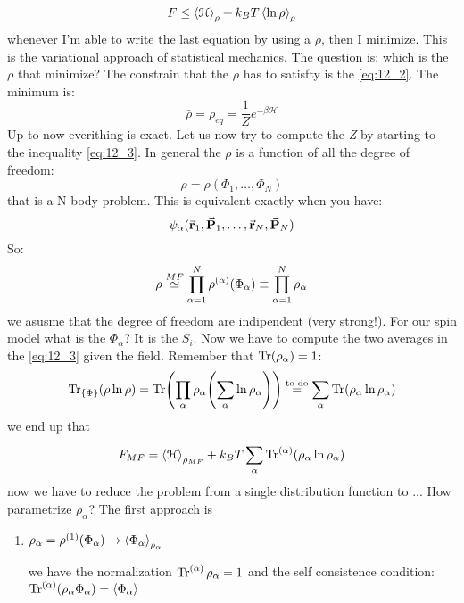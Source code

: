 \documentclass[../main/main.tex]{subfiles}
\begin{document}
\begin{equation}
  F \le \expval{\mathcal{H}}_\rho + k_B T \expval{\ln{\rho } }_\rho
  \label{eq:12_3}
\end{equation}
whenever I'm able to write the last equation by using a \( \rho  \), then I minimize. This is the variational approach of statistical mechanics. The question is: which is the \( \rho  \) that minimize?
The constrain that the \( \rho  \) has to satisfty is the \eqref{eq:12_2}.
The minimum is:
\begin{equation}
  \bar{\rho } = \rho _{eq} = \frac{1}{Z} e^{-\beta \mathcal{H}}
\end{equation}
Up to now everithing is exact. Let us now try to compute the \emph{Z} by starting to the inequality \eqref{eq:12_3}.
In general the \( \rho  \) is a function of all the degree of freedom:
\begin{equation}
  \rho = \rho (\Phi _1, \dots, \Phi _N)
\end{equation}
that is a N body problem. This is equivalent exactly when you have:
\begin{equation}
  \psi _ \alpha (\va{r}_1, \va{P}_1, \dots, \va{r}_N, \va{P}_N )
\end{equation}
So:
\begin{equation}
  \rho \overset{MF}{\simeq } \prod_{\alpha =1}^{N} \rho^{(\alpha )}\qty(\Phi _ \alpha ) \equiv \prod_{\alpha =1}^{N} \rho_ \alpha
\end{equation}
we asusme that the degree of freedom are indipendent (very strong!). For our spin model what is the \( \Phi _ \alpha  \)? It is the \( S_i \).
Now we have to compute the two averages in the \eqref{eq:12_3} given the field.
Remember that \( \Tr(\rho _ \alpha ) = 1  \):
\begin{equation}
  \Tr_{\{ \Phi  \}  } ( \rho \ln{\rho } ) = \Tr(\prod_{\alpha }^{} \rho _ \alpha  \qty( \sum_{\alpha }^{} \ln{\rho _ \alpha }  ) ) \overset{\text{to do}}{=} \sum_{\alpha }^{}
  \Tr(\rho _ \alpha  \ln{\rho _ \alpha } )
\end{equation}
we end up that
\begin{equation}
  F_{MF} = \expval{\mathcal{H}}_{\rho _{MF}} + k_B T \sum_{\alpha }^{} \Tr^{(\alpha )}(\rho _ \alpha  \ln{\rho _ \alpha } )
\end{equation}
now we have to reduce the problem from a single distribution function to ...
How parametrize \( \rho _ \alpha  \)?
The first approach is
\begin{enumerate}
\item \( \rho _ \alpha = \rho ^{(1)} ( \Phi _{\alpha })  \rightarrow  \expval{\Phi _ \alpha }_ {\rho _ \alpha } \)

we have the normalization \( \Tr^{(\alpha )} \rho _ \alpha = 1  \) and the self consistence condition: \( \Tr^{(\alpha )}(\rho _ \alpha \Phi _ \alpha ) = \expval{\Phi _ \alpha }   \)

\end{enumerate}
\end{document}
